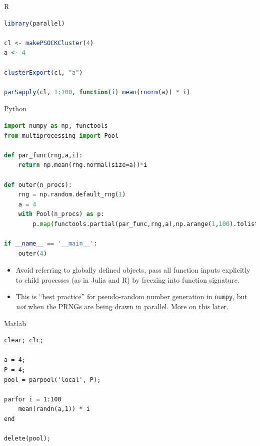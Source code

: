 \documentclass[aspectratio=1610,handout]{beamer}
\begin{document}
\begin{frame}[fragile]{R}
    \begin{lstlisting}[language=R]
library(parallel)

cl <- makePSOCKCluster(4)
a <- 4

clusterExport(cl, "a")

parSapply(cl, 1:100, function(i) mean(rnorm(a)) * i)
    \end{lstlisting}
\end{frame}

\begin{frame}[fragile]{Python}
    \begin{lstlisting}[language=Python]
import numpy as np, functools
from multiprocessing import Pool

def par_func(rng,a,i):
    return np.mean(rng.normal(size=a))*i

def outer(n_procs):
    rng = np.random.default_rng(1)
    a = 4
    with Pool(n_procs) as p:
        p.map(functools.partial(par_func,rng,a),np.arange(1,100).tolist())

if __name__ == '__main__':
    outer(4)
    \end{lstlisting}
    \begin{itemize}
        \item Avoid referring to globally defined objects, pass all function inputs explicitly to child processes (as in Julia and R) by freezing into function signature.
        \item This is ``best practice'' for pseudo-random number generation in \verb|numpy|, but \emph{not} when the PRNGs are being drawn in parallel.  More on this later. 
    \end{itemize}
\end{frame}

\begin{frame}[fragile]{Matlab}
    \begin{lstlisting}
clear; clc; 

a = 4;
P = 4;
pool = parpool('local', P);

parfor i = 1:100
    mean(randn(a,1)) * i
end

delete(pool);
    \end{lstlisting}
\end{frame}
\end{document}
